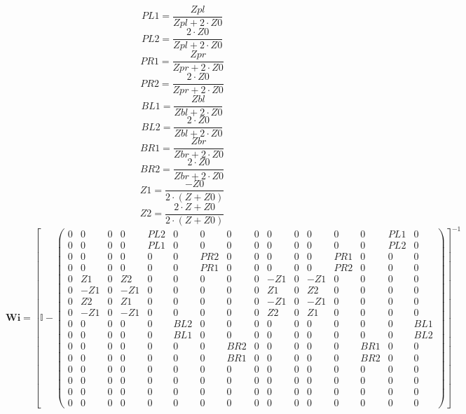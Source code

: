 \[ PL1=\frac{Zpl}{Zpl+2\cdot Z0} \]
\[ PL2=\frac{2\cdot Z0}{Zpl+2\cdot Z0} \]
\[ PR1=\frac{Zpr}{Zpr+2\cdot Z0} \]
\[ PR2=\frac{2\cdot Z0}{Zpr+2\cdot Z0} \]
\[ BL1=\frac{Zbl}{Zbl+2\cdot Z0} \]
\[ BL2=\frac{2\cdot Z0}{Zbl+2\cdot Z0} \]
\[ BR1=\frac{Zbr}{Zbr+2\cdot Z0} \]
\[ BR2=\frac{2\cdot Z0}{Zbr+2\cdot Z0} \]
\[ Z1=\frac{-Z0}{2\cdot \left(Z+Z0\right)} \]
\[ Z2=\frac{2\cdot Z+Z0}{2\cdot \left(Z+Z0\right)} \]
\[ \mathbf{Wi} =  \left[ \mathbb{I}  - \left(\begin{smallmatrix} 0 & 0
& 0 & 0 & PL2 & 0 & 0 & 0 & 0 & 0 & 0 & 0 & 0 & 0 & PL1 & 0 \\ 0 & 0 &
0 & 0 & PL1 & 0 & 0 & 0 & 0 & 0 & 0 & 0 & 0 & 0 & PL2 & 0 \\ 0 & 0 & 0
& 0 & 0 & 0 & PR2 & 0 & 0 & 0 & 0 & 0 & PR1 & 0 & 0 & 0 \\ 0 & 0 & 0 &
0 & 0 & 0 & PR1 & 0 & 0 & 0 & 0 & 0 & PR2 & 0 & 0 & 0 \\ 0 & Z1 & 0 &
Z2 & 0 & 0 & 0 & 0 & 0 & -Z1 & 0 & -Z1 & 0 & 0 & 0 & 0 \\ 0 & -Z1 & 0
& -Z1 & 0 & 0 & 0 & 0 & 0 & Z1 & 0 & Z2 & 0 & 0 & 0 & 0 \\ 0 & Z2 & 0
& Z1 & 0 & 0 & 0 & 0 & 0 & -Z1 & 0 & -Z1 & 0 & 0 & 0 & 0 \\ 0 & -Z1 &
0 & -Z1 & 0 & 0 & 0 & 0 & 0 & Z2 & 0 & Z1 & 0 & 0 & 0 & 0 \\ 0 & 0 & 0
& 0 & 0 & BL2 & 0 & 0 & 0 & 0 & 0 & 0 & 0 & 0 & 0 & BL1 \\ 0 & 0 & 0 &
0 & 0 & BL1 & 0 & 0 & 0 & 0 & 0 & 0 & 0 & 0 & 0 & BL2 \\ 0 & 0 & 0 & 0
& 0 & 0 & 0 & BR2 & 0 & 0 & 0 & 0 & 0 & BR1 & 0 & 0 \\ 0 & 0 & 0 & 0 &
0 & 0 & 0 & BR1 & 0 & 0 & 0 & 0 & 0 & BR2 & 0 & 0 \\ 0 & 0 & 0 & 0 & 0
& 0 & 0 & 0 & 0 & 0 & 0 & 0 & 0 & 0 & 0 & 0 \\ 0 & 0 & 0 & 0 & 0 & 0 &
0 & 0 & 0 & 0 & 0 & 0 & 0 & 0 & 0 & 0 \\ 0 & 0 & 0 & 0 & 0 & 0 & 0 & 0
& 0 & 0 & 0 & 0 & 0 & 0 & 0 & 0 \\ 0 & 0 & 0 & 0 & 0 & 0 & 0 & 0 & 0 &
0 & 0 & 0 & 0 & 0 & 0 & 0 \end{smallmatrix}\right) \right]^{-1}  \]
